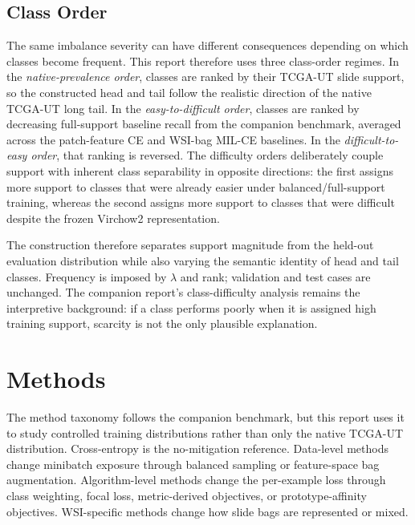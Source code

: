 \documentclass[11pt]{article}
\begin{document}
\subsection{Class Order}
\label{sec:class-orders}
The same imbalance severity can have different consequences depending on which classes become frequent. This report therefore uses three class-order regimes. In the \emph{native-prevalence order}, classes are ranked by their TCGA-UT slide support, so the constructed head and tail follow the realistic direction of the native TCGA-UT long tail. In the \emph{easy-to-difficult order}, classes are ranked by decreasing full-support baseline recall from the companion benchmark, averaged across the patch-feature CE and WSI-bag MIL-CE baselines. In the \emph{difficult-to-easy order}, that ranking is reversed. The difficulty orders deliberately couple support with inherent class separability in opposite directions: the first assigns more support to classes that were already easier under balanced/full-support training, whereas the second assigns more support to classes that were difficult despite the frozen Virchow2 representation.

The construction therefore separates support magnitude from the held-out evaluation distribution while also varying the semantic identity of head and tail classes. Frequency is imposed by $\lambda$ and rank; validation and test cases are unchanged. The companion report's class-difficulty analysis remains the interpretive background: if a class performs poorly when it is assigned high training support, scarcity is not the only plausible explanation.

\section{Methods}
\label{sec:methods}
The method taxonomy follows the companion benchmark, but this report uses it to study controlled training distributions rather than only the native TCGA-UT distribution. Cross-entropy is the no-mitigation reference. Data-level methods change minibatch exposure through balanced sampling or feature-space bag augmentation. Algorithm-level methods change the per-example loss through class weighting, focal loss, metric-derived objectives, or prototype-affinity objectives. WSI-specific methods change how slide bags are represented or mixed.
\end{document}
